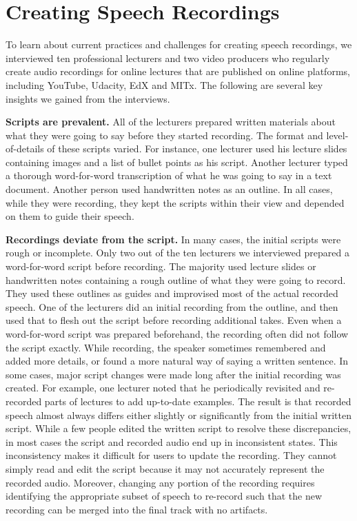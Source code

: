 \section{Creating Speech Recordings}

To learn about current practices and challenges for creating speech recordings, we interviewed ten professional lecturers and two video producers who regularly create audio recordings for online lectures that are published on online platforms, including YouTube, Udacity, EdX and MITx. The following are several key insights we gained from the interviews.

\textbf{Scripts are prevalent.} All of the lecturers prepared written materials about what they were going to say before they started recording. The format and level-of-details of these scripts varied. For instance, one lecturer used his lecture slides containing images and a list of bullet points as his script. Another lecturer typed a thorough word-for-word transcription of what he was going to say in a text document. Another person used handwritten notes as an outline. In all cases, while they were recording, they kept the scripts within their view and depended on them to guide their speech.  

\textbf{Recordings deviate from the script.} In many cases, the initial scripts were rough or incomplete. Only two out of the ten lecturers we interviewed prepared a word-for-word script before recording. The majority used lecture slides or handwritten notes containing a rough outline of what they were going to record. They used these outlines as guides and improvised most of the actual recorded speech. One of the lecturers did an initial recording from the outline, and then used that to flesh out the script before recording additional takes. Even when a word-for-word script was prepared beforehand, the recording often did not follow the script exactly. While recording, the speaker sometimes remembered and added more details, or found a more natural way of saying a written sentence. In some cases, major script changes were made long after the initial recording was created. For example, one lecturer noted that he periodically revisited and re-recorded parts of lectures to add up-to-date examples. The result is that recorded speech almost always differs either slightly or significantly from the initial written script. 
While a few people edited the written script to resolve these discrepancies, in most cases the script and recorded audio end up in inconsistent states. This inconsistency makes it difficult for users to update the recording. They cannot simply read and edit the script because it may not accurately represent the recorded audio. Moreover,  changing any portion of the recording requires identifying the appropriate subset of speech to re-record such that the new recording can be merged into the final track with no artifacts.

